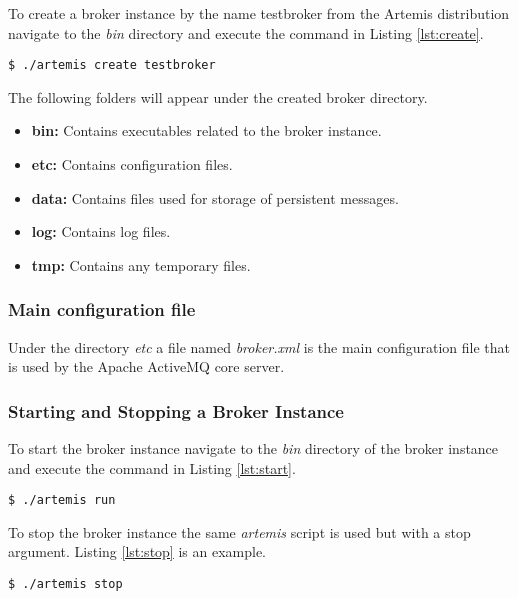To create a broker instance by the name testbroker from the Artemis distribution navigate to the \textit{bin} directory and execute the  command in Listing \ref{lst:create}. 

\bigskip
\begin{lstlisting}[style=BashInputStyle,caption=Creating Broker Instance, label={lst:create}]
  $ ./artemis create testbroker
\end{lstlisting}

The following folders will appear under the created broker directory.

\begin{itemize}
    \item \textbf{bin:}
        Contains executables related to the broker instance.

    \item \textbf{etc:}
        Contains configuration files.

    \item \textbf{data:}
        Contains files used for storage of persistent messages.

    \item \textbf{log:}
        Contains log files.

    \item \textbf{tmp:}
        Contains any temporary files.
         
\end{itemize}

\subsubsection{Main configuration file}

Under the directory \textit{etc} a file named \textit{broker.xml} is the main configuration file that is used by the Apache ActiveMQ core server. 

\subsubsection{Starting and Stopping a Broker Instance}

To start the broker instance navigate to the \textit{bin} directory of the broker instance and execute the command in Listing \ref{lst:start}.

\bigskip
\begin{lstlisting}[style=BashInputStyle,caption=Starting Broker Instance, label={lst:start}]
  $ ./artemis run
\end{lstlisting}

To stop the broker instance the same \textit{artemis} script is used but with a stop argument. Listing \ref{lst:stop} is an example.

\bigskip
\begin{lstlisting}[style=BashInputStyle,caption=Stopping Broker Instance, label={lst:stop}]
  $ ./artemis stop
\end{lstlisting}
